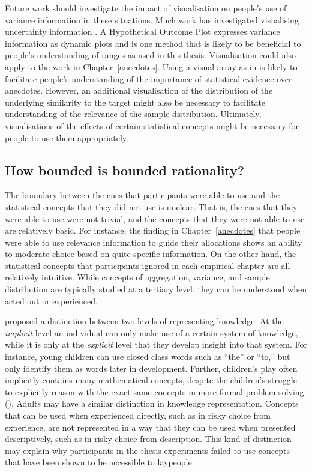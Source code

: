 \documentclass[a4paper, nobind, dvipsnames]{templates/ociamthesis}
\theoremstyle{definition}
\theoremstyle{definition}
\theoremstyle{definition}
\theoremstyle{definition}
\theoremstyle{remark}
\begin{document}
Future work should investigate the impact of visualisation on people's use of
variance information in these situations. Much work has investigated visualising
uncertainty information \autocite{bostrom2008,maceachren1992,kinkeldey2017,padilla2018,davis1997,ristovski2014,brodlie2012,johnson2003,potter2012,lipkus1999,lipkus2007,spiegelhalter2011,pang1997,kox2018,lapinski2009,torsneyweir2015}. A Hypothetical Outcome Plot \autocites[HOP;][]{kale2019,hullman2015} expresses variance information as dynamic plots and is one method
that is likely to be beneficial to people's understanding of ranges as used in
this thesis. Visualisation could also apply to the work in
Chapter~\ref{anecdotes}. Using a visual array as in \textcite{jaramillo2019} is likely to
facilitate people's understanding of the importance of statistical evidence over
anecdotes. However, an additional visualisation of the distribution of the
underlying similarity to the target might also be necessary to facilitate
understanding of the relevance of the sample distribution. Ultimately,
visualisations of the effects of certain statistical concepts might be necessary
for people to use them appropriately.

\subsection{How bounded is bounded rationality?}

The boundary between the cues that participants were able to use and the
statistical concepts that they did not use is unclear. That is, the cues that
they were able to use were not trivial, and the concepts that they were not able
to use are relatively basic. For instance, the finding in
Chapter~\ref{anecdotes} that people were able to use relevance information to
guide their allocations shows an ability to moderate choice based on quite
specific information. On the other hand, the statistical concepts that
participants ignored in each empirical chapter are all relatively intuitive.
While concepts of aggregation, variance, and sample distribution are typically
studied at a tertiary level, they can be understood when acted out or
experienced.

\textcite{clark1993} proposed a distinction between two levels of representing knowledge.
At the \emph{implicit} level an individual can only make use of a certain system of
knowledge, while it is only at the \emph{explicit} level that they develop insight
into that system. For instance, young children can use closed class words such
as ``the'' or ``to,'' but only identify them as words later in development. Further,
children's play often implicitly contains many mathematical concepts, despite
the children's struggle to explicitly reason with the exact same concepts in
more formal problem-solving (\textcite{sarama2009}). Adults may have a similar distinction
in knowledge representation. Concepts that can be used when experienced
directly, such as in risky choice from experience, are not represented in a way
that they can be used when presented descriptively, such as in risky choice from
description. This kind of distinction may explain why participants in the thesis
experiments failed to use concepts that have been shown to be accessible to
laypeople.
\end{document}
